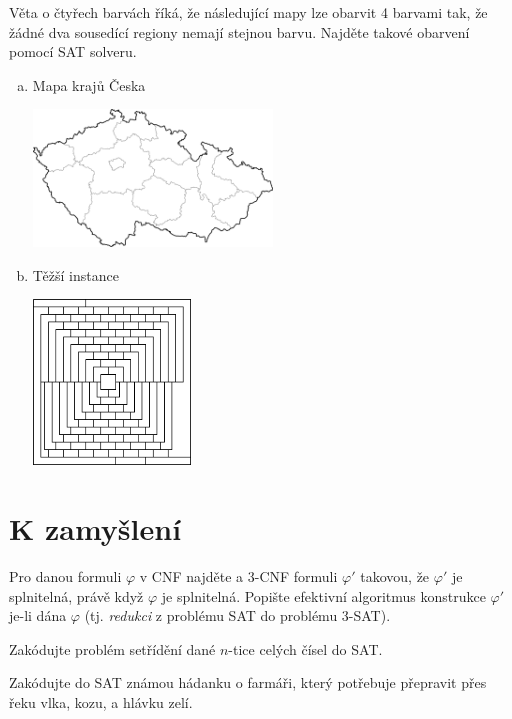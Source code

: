     
\begin{problem}

    Věta o čtyřech barvách říká, že následující mapy lze obarvit 4 barvami tak, že žádné dva sousedící regiony nemají stejnou barvu. Najděte takové obarvení pomocí SAT solveru.
    \begin{multicols}{2}
    \begin{enumerate}[(a)]
        \item Mapa krajů Česka  
        
        \vfill \includegraphics[width=0.5\textwidth]{files/map-coloring-czechia.png} \vfill
        
        \item Těžší instance  
        
        \vfill \includegraphics[width=0.33\textwidth]{files/map-coloring-hard.png} \vfill
    \end{enumerate}
    \end{multicols}

\end{problem}



\section*{K zamyšlení}
    
    
\begin{problem} 
    
    Pro danou formuli $\varphi$ v CNF najděte a 3-CNF formuli $\varphi'$ takovou, že $\varphi'$ je splnitelná, právě když $\varphi$ je splnitelná. Popište efektivní algoritmus konstrukce $\varphi'$ je-li dána $\varphi$ (tj. \emph{redukci} z problému SAT do problému 3-SAT).

\end{problem}


\begin{problem}
    Zakódujte problém setřídění dané $n$-tice celých čísel do SAT.
\end{problem}

\begin{problem}
    Zakódujte do SAT známou hádanku o farmáři, který potřebuje přepravit přes řeku vlka, kozu, a hlávku zelí.
\end{problem}
